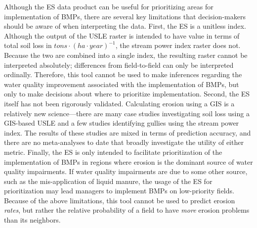 \documentclass{article}
\begin{document}
	Although the ES data product can be useful for prioritizing areas for implementation of BMPs, there are several key limitations that decision-makers should be aware of when interpreting the data. First, the ES is a unitless index. Although the output of the USLE raster is intended to have value in terms of total soil loss in $tons \cdot (ha \cdot year)^{-1}$, the stream power index raster does not. Because the two are combined into a single index, the resulting raster cannot be interpreted absolutely; differences from field-to-field can only be interpreted ordinally. Therefore, this tool cannot be used to make inferences regarding the water quality improvement associated with the implementation of BMPs, but only to make decisions about where to prioritize implementation. Second, the ES itself has not been rigorously validated. Calculating erosion using a GIS is a relatively new science---there are many case studies investigating soil loss using a GIS-based USLE and a few studies identifying gullies using the stream power index. The results of these studies are mixed in terms of prediction accuracy, and there are no meta-analyses to date that broadly investigate the utility of either metric. Finally, the ES is only intended to facilitate prioritization of the implementation of BMPs in regions where erosion is the dominant source of water quality impairments. If water quality impairments are due to some other source, such as the mis-application of liquid manure, the usage of the ES for prioritization may lead managers to implement BMPs on low-priority fields. Because of the above limitations, this tool cannot be used to predict erosion \emph{rates}, but rather the relative probability of a field to have \emph{more} erosion problems than its neighbors.
\pagebreak
\printbibliography
\pagebreak
\end{document}
